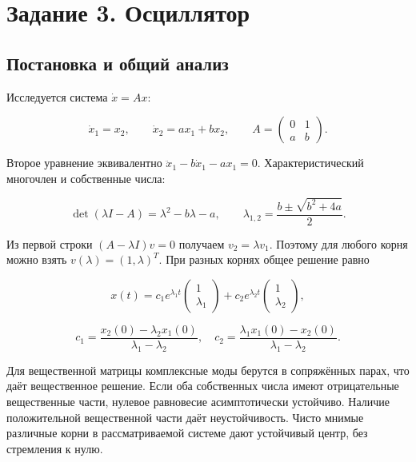 \section{Задание 3. Осциллятор}

\subsection{Постановка и общий анализ}

Исследуется система $\dot x=Ax$:

\begin{equation}
\dot x_1=x_2,\qquad \dot x_2=ax_1+bx_2,\qquad
A=\begin{pmatrix}0&1\\a&b\end{pmatrix}.
\end{equation}

Второе уравнение эквивалентно $\ddot x_1-b\dot x_1-ax_1=0$. Характеристический многочлен и собственные числа:

\begin{equation}
\det(\lambda I-A)=\lambda^2-b\lambda-a,\qquad
\lambda_{1,2}=\frac{b\pm\sqrt{b^2+4a}}{2}.
\end{equation}

Из первой строки $(A-\lambda I)v=0$ получаем $v_2=\lambda v_1$. Поэтому для любого корня можно взять $v(\lambda)=(1,\lambda)^T$. При разных корнях общее решение равно

\begin{equation}
x(t)=c_1e^{\lambda_1t}\begin{pmatrix}1\\\lambda_1\end{pmatrix}
+c_2e^{\lambda_2t}\begin{pmatrix}1\\\lambda_2\end{pmatrix},
\end{equation}

\begin{equation}
c_1=\frac{x_2(0)-\lambda_2x_1(0)}{\lambda_1-\lambda_2},\quad
c_2=\frac{\lambda_1x_1(0)-x_2(0)}{\lambda_1-\lambda_2}.
\end{equation}

Для вещественной матрицы комплексные моды берутся в сопряжённых парах, что даёт вещественное решение. Если оба собственных числа имеют отрицательные вещественные части, нулевое равновесие асимптотически устойчиво. Наличие положительной вещественной части даёт неустойчивость. Чисто мнимые различные корни в рассматриваемой системе дают устойчивый центр, без стремления к нулю.

